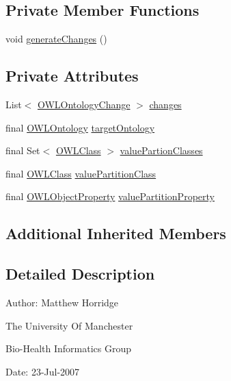 \subsection*{Private Member Functions}
\begin{DoxyCompactItemize}
\item 
void \hyperlink{classorg_1_1semanticweb_1_1owlapi_1_1_create_value_partition_ad5802bcb1bad2a9edf26082a271c7698}{generate\-Changes} ()
\end{DoxyCompactItemize}
\subsection*{Private Attributes}
\begin{DoxyCompactItemize}
\item 
List$<$ \hyperlink{classorg_1_1semanticweb_1_1owlapi_1_1model_1_1_o_w_l_ontology_change}{O\-W\-L\-Ontology\-Change} $>$ \hyperlink{classorg_1_1semanticweb_1_1owlapi_1_1_create_value_partition_a3253f2fc9c5a1b4f7eefb965428f382b}{changes}
\item 
final \hyperlink{interfaceorg_1_1semanticweb_1_1owlapi_1_1model_1_1_o_w_l_ontology}{O\-W\-L\-Ontology} \hyperlink{classorg_1_1semanticweb_1_1owlapi_1_1_create_value_partition_a51fe93de1be6192dd7a7efcb409a8d8c}{target\-Ontology}
\item 
final Set$<$ \hyperlink{interfaceorg_1_1semanticweb_1_1owlapi_1_1model_1_1_o_w_l_class}{O\-W\-L\-Class} $>$ \hyperlink{classorg_1_1semanticweb_1_1owlapi_1_1_create_value_partition_ad93b5480402729ec84a6a4cc96bd3792}{value\-Partion\-Classes}
\item 
final \hyperlink{interfaceorg_1_1semanticweb_1_1owlapi_1_1model_1_1_o_w_l_class}{O\-W\-L\-Class} \hyperlink{classorg_1_1semanticweb_1_1owlapi_1_1_create_value_partition_ad0545108ace014a623992232fafee5b7}{value\-Partition\-Class}
\item 
final \hyperlink{interfaceorg_1_1semanticweb_1_1owlapi_1_1model_1_1_o_w_l_object_property}{O\-W\-L\-Object\-Property} \hyperlink{classorg_1_1semanticweb_1_1owlapi_1_1_create_value_partition_ac88312b96c91192a43e20b2b78df3860}{value\-Partition\-Property}
\end{DoxyCompactItemize}
\subsection*{Additional Inherited Members}


\subsection{Detailed Description}
Author\-: Matthew Horridge\par
 The University Of Manchester\par
 Bio-\/\-Health Informatics Group\par
 Date\-: 23-\/\-Jul-\/2007\par
\par
 

